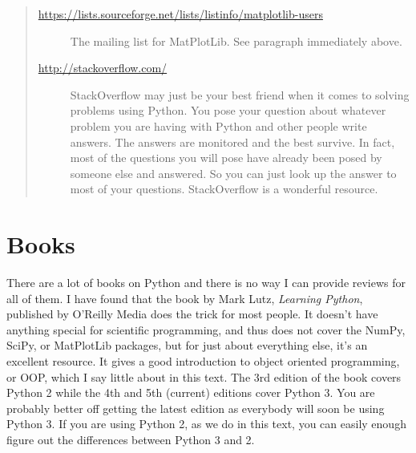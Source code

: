 \documentclass[letterpaper,10pt,english]{sphinxmanual}
\begin{document}
\begin{quote}
\begin{description}
\item[{\href{https://lists.sourceforge.net/lists/listinfo/matplotlib-users}{https://lists.sourceforge.net/lists/listinfo/matplotlib-users}}] \leavevmode
The mailing list for MatPlotLib.  See paragraph immediately above.

\item[{\href{http://stackoverflow.com/}{http://stackoverflow.com/}}] \leavevmode
StackOverflow may just be your best friend when it comes to solving problems using Python.  You pose your question about whatever problem you are having with Python and other people write answers.  The answers are monitored and the best survive.  In fact, most of the questions you will pose have already been posed by someone else and answered.  So you can just look up the answer to most of your questions.  StackOverflow is a wonderful resource.

\end{description}
\end{quote}


\section{Books}
\label{apdx3/apdx3_resources:books}
There are a lot of books on Python and there is no way I can provide reviews for all of them.  I have found that the book by Mark Lutz, \emph{Learning Python}, published by O'Reilly Media does the trick for most people.  It doesn't have anything special for scientific programming, and thus does not cover the NumPy, SciPy, or MatPlotLib packages, but for just about everything else, it's an excellent resource.  It gives a good introduction to object oriented programming, or OOP, which I say little about in this text.  The 3rd edition of the book covers Python 2 while the 4th and 5th (current) editions cover Python 3.  You are probably better off getting the latest edition as everybody will soon be using Python 3.  If you are using Python 2, as we do in this text, you can easily enough figure out the differences between Python 3 and 2.



\renewcommand{\indexname}{Index}
\printindex
\end{document}

